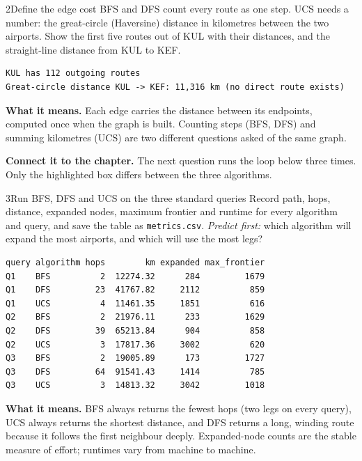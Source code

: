 \begin{labquestion}{2}{Define the edge cost}
BFS and DFS count every route as one step. UCS needs a number: the great-circle (Haversine) distance in kilometres between the two airports. Show the first five routes out of KUL with their distances, and the straight-line distance from KUL to KEF.
\end{labquestion}
\begin{labanswer}

\begin{refoutput}
\begin{lstlisting}[style=utpterminal]
KUL has 112 outgoing routes
Great-circle distance KUL -> KEF: 11,316 km (no direct route exists)
\end{lstlisting}
\end{refoutput}

\textbf{What it means.} Each edge carries the distance between its endpoints, computed once when the graph is built. Counting steps (BFS, DFS) and summing kilometres (UCS) are two different questions asked of the same graph.
\end{labanswer}

\textbf{Connect it to the chapter.} The next question runs the loop below three times. Only the highlighted box differs between the three algorithms.


\begin{labquestion}{3}{Run BFS, DFS and UCS on the three standard queries}
Record path, hops, distance, expanded nodes, maximum frontier and runtime for every algorithm and query, and save the table as \texttt{metrics.csv}. \emph{Predict first:} which algorithm will expand the most airports, and which will use the most legs?
\end{labquestion}
\begin{labanswer}

\begin{refoutput}
\begin{lstlisting}[style=utpterminal]
query algorithm hops        km expanded max_frontier
Q1    BFS          2  12274.32      284         1679
Q1    DFS         23  41767.82     2112          859
Q1    UCS          4  11461.35     1851          616
Q2    BFS          2  21976.11      233         1629
Q2    DFS         39  65213.84      904          858
Q2    UCS          3  17817.36     3002          620
Q3    BFS          2  19005.89      173         1727
Q3    DFS         64  91541.43     1414          785
Q3    UCS          3  14813.32     3042         1018
\end{lstlisting}
\end{refoutput}

\textbf{What it means.} BFS always returns the fewest hops (two legs on every query), UCS always returns the shortest distance, and DFS returns a long, winding route because it follows the first neighbour deeply. Expanded-node counts are the stable measure of effort; runtimes vary from machine to machine.
\end{labanswer}

